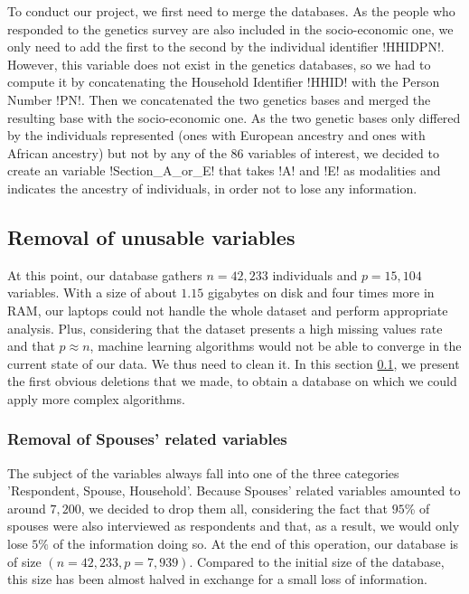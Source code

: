 \documentclass[]{article}
\begin{document}
\noindent
To conduct our project, we first need to merge the databases. As the people who responded to the genetics survey are also included in the socio-economic one, we only need to add the first to the second by the individual identifier \pyth!HHIDPN!. However, this variable does not exist in the genetics databases, so we had to compute it by concatenating the Household Identifier \pyth!HHID! with the Person Number \pyth!PN!. Then we concatenated the two genetics bases and merged the resulting base with the socio-economic one. As the two genetic bases only differed by the individuals represented (ones with European ancestry and ones with African ancestry) but not by any of the $86$ variables of interest, we decided to create an  variable \pyth!Section_A_or_E! that takes \pyth!A! and \pyth!E! as modalities and indicates the ancestry of individuals, in order not to lose any information.

\subsection{Removal of unusable variables}
\label{removal_of_unusable_variables}
At this point, our database gathers $n=42,233$ individuals and $p=15,104$ variables. With a size of about $1.15$ gigabytes on disk and four times more in RAM, our laptops could not handle the whole dataset and perform appropriate analysis. Plus, considering that the dataset presents a high missing values rate and that $p\approx n$, machine learning algorithms would not be able to converge in the current state of our data. We thus need to clean it. In this section \ref{removal_of_unusable_variables}, we present the first obvious deletions that we made, to obtain a database on which we could apply more complex algorithms.

\subsubsection{Removal of Spouses' related variables}
The subject of the variables always fall into one of the three categories 'Respondent, Spouse, Household'. Because Spouses' related variables amounted to around $7,200$, we decided to drop them all, considering the fact that $95$\% of spouses were also interviewed as respondents and that, as a result, we would only lose $5\%$ of the information doing so.
At the end of this operation, our database is of size $(n=42,233, p=7,939)$. Compared to the initial size of the database, this size has been almost halved in exchange for a small loss of information.
\end{document}
